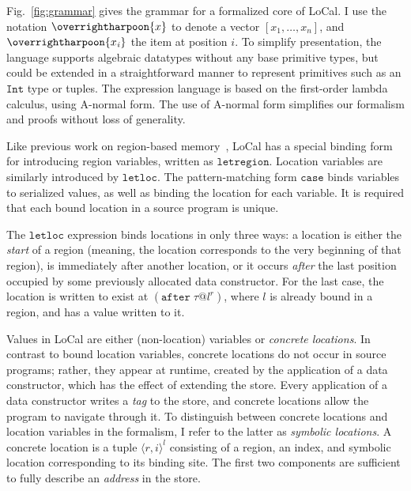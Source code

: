 \documentclass[showabstract,showacknowledgments,showpreface,showdedication,school]{iuphd}
\makeatletter
\theoremstyle{nonumberplain}
\newcommand{\sysname}[0]{LoCal\xspace}
\newcommand{\ourcalc}[0]{\sysname}
\newcommand{\keywd}[1]{\mathit{#1}}
\newcommand{\gramwd}[1]{\texttt{#1}}
\newcommand{\sgramwd}[1]{\texttt{#1}}
\newcommand{\skeywd}[1]{\mathit{#1}}
\newcommand{\TYP}{\keywd{\tau}}
\newcommand{\loc}{\skeywd{l}}
\newcommand{\concreteloc}[3]{\ensuremath{\langle #1, #2 \rangle ^{#3}}}
\newcommand{\reg}{\skeywd{r}}
\newcommand{\ind}{\keywd{i}}
\newcommand{\afterl}[1]{(\gramwd{after}\; #1)}
\newcommand{\locreg}[2]{\ensuremath{{#1}^{#2}}}
\newcommand{\tyatlocreg}[3]{#1 \ensuremath{@} \locreg{#2}{#3}}
\newcommand{\overharpoon}[1]{\overrightharpoon{#1}}
\newcommand{\Figref}[1]{Fig.~\ref{#1}}
\makeatother
\begin{document}
\Figref{fig:grammar} gives the grammar for a formalized core of \ourcalc{}.
I use the notation $\overharpoon{x}$ to denote a vector $[
x_1, \ldots, x_n]$, and $\overharpoon{x_{\ind}}$ the item at position
$\ind$.
To simplify presentation, the language supports
algebraic datatypes without any base primitive types, but could be extended in a straightforward
manner to represent primitives such as an $\sgramwd{Int}$ type or tuples.
The expression language is based on the first-order lambda calculus,
using A-normal form.
The use of A-normal form simplifies our formalism and proofs
without loss of generality.

Like previous work on region-based memory~\cite{regioncalcs},
\ourcalc{} has a special binding
form for introducing region variables, written as
$\sgramwd{letregion}$.
Location variables are similarly introduced by $\sgramwd{letloc}$.
The pattern-matching form $\sgramwd{case}$ binds variables to
serialized values, as well as binding the location for each variable.
It is required that each bound location in
a source program is unique.

The $\sgramwd{letloc}$ expression binds locations in only three ways:
a location is either the \emph{start} of a region (meaning, the
location corresponds to the very beginning of that region), is
immediately after another location, or it occurs \emph{after} the last
position occupied by some previously allocated data constructor.
For the last case, the location is written to exist at
$\afterl{\tyatlocreg{\TYP}{\loc}{\reg}}$, where $\loc$ is already
bound in a region, and has a value written to it.


Values in \ourcalc{} are either (non-location) variables or
\emph{concrete locations}.
In contrast to bound location variables, concrete locations
do not occur in source programs; rather, they appear at runtime, created by the
application of a data constructor, which has the effect of
extending the store.
Every application of a data constructor writes a \emph{tag} to the store, and
concrete locations allow the program to navigate through it.
To distinguish between concrete locations and location variables in
the formalism, I refer to the latter as \emph{symbolic locations}.
A concrete location is a tuple
$\concreteloc{\reg}{\ind}{\loc}$ consisting of a region, an index, and
symbolic location corresponding to its binding site.
The first two components are sufficient to fully describe
an \emph{address} in the store.
\end{document}
